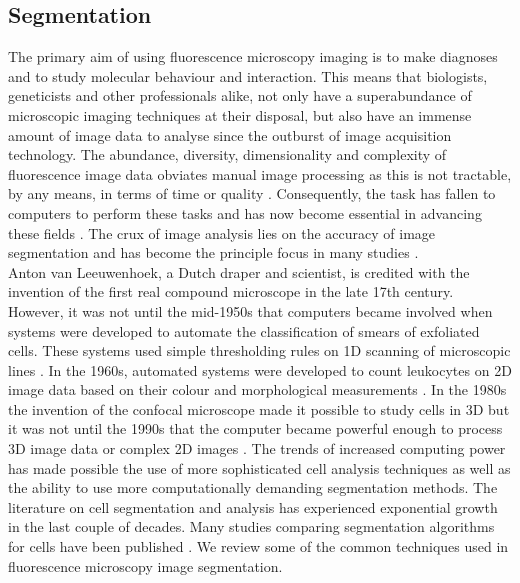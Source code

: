 \subsection{Segmentation}
The primary aim of using fluorescence microscopy imaging is to make diagnoses and to study molecular behaviour and interaction.
This means that biologists, geneticists and other professionals alike, not only have a superabundance of microscopic imaging techniques at their disposal, but also have an immense amount of image data to analyse since the outburst of image acquisition technology.
The abundance, diversity, dimensionality and complexity of fluorescence image data obviates manual image processing as this is not tractable, by any means, in terms of time or quality \citep{Meijering2012,Ryan2016}.
Consequently, the task has fallen to computers to perform these tasks and has now become essential in advancing these fields \citep{Alberts2007,Vonesch2006}.
The crux of image analysis lies on the accuracy of image segmentation and has become the principle focus in many studies \citep{Bengtsson2004}.\\

Anton van Leeuwenhoek, a Dutch draper and scientist, is credited with the invention of the first real compound microscope in the late 17th century.
However, it was not until the mid-1950s that computers became involved when systems were developed to automate the classification of smears of exfoliated cells.
These systems used simple thresholding rules on 1D scanning of microscopic lines \citep{Tolles1955}.
In the 1960s, automated systems were developed to count leukocytes on 2D image data based on their colour and morphological measurements \citep{Prewitt1966}.
In the 1980s the invention of the confocal microscope made it possible to study cells in 3D but it was not until the 1990s that the computer became powerful enough to process 3D image data or complex 2D images \citep{Gurcan2009}.
The trends of increased computing power has made possible the use of more sophisticated cell analysis techniques as well as the ability to use more computationally demanding segmentation methods.
The literature on cell segmentation and analysis has experienced exponential growth in the last couple of decades.
Many studies comparing segmentation algorithms for cells have been published \citep{Dima2011,Pincus2007,Coelho2009}.
We review some of the common techniques used in fluorescence microscopy image segmentation.

